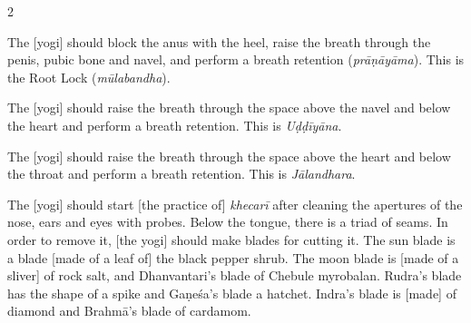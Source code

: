 \begin{nohyp}
\begin{multicols}{2}
\begin{eng}

The [yogi] should block the anus with the heel, raise the breath through the penis, pubic bone and navel, and perform a breath retention (\textit{prāṇāyāma}). This is the Root Lock (\textit{mūlabandha}).
\vskip 7pt


The [yogi] should raise the breath through the space above the navel and below the heart and perform a breath retention. This is \textit{Uḍḍīyāna}.
\vskip 7pt


The [yogi] should raise the breath through the space above the heart and below the throat and perform a breath retention. This is \textit{Jālandhara}.
\vskip 7pt



The [yogi] should start [the practice of] \textit{khecarī} after cleaning the apertures of the nose, ears and eyes with probes. Below the tongue, there is a triad of seams. In order to remove it, [the yogi] should make blades for cutting it. The sun blade is a blade [made of a leaf of] the black pepper shrub. The moon blade is [made of a sliver] of rock salt, and Dhanvantari’s blade of Chebule myrobalan. Rudra’s blade has the shape of a spike and Gaṇeśa’s blade a hatchet. Indra’s blade is [made] of diamond and Brahmā’s blade of cardamom.


\end{eng}
\end{multicols}
\end{nohyp}
